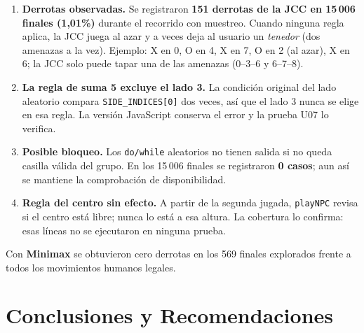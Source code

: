 \documentclass[12pt,a4paper]{article}
\begin{document}
\begin{enumerate}
  \item \textbf{Derrotas observadas.} Se registraron \textbf{151 derrotas de la JCC
        en 15\,006 finales (1,01\%)} durante el recorrido con muestreo. Cuando
        ninguna regla aplica, la JCC juega al azar y a veces deja al usuario un
        \emph{tenedor} (dos amenazas a la vez). Ejemplo: X en 0, O en 4, X en 7,
        O en 2 (al azar), X en 6; la JCC solo puede tapar una de las amenazas
        (0--3--6 y 6--7--8).
  \item \textbf{La regla de suma 5 excluye el lado 3.} La condición original del
        lado aleatorio compara \texttt{SIDE\_INDICES[0]} dos veces, así que el
        lado 3 nunca se elige en esa regla. La versión JavaScript conserva el
        error y la prueba U07 lo verifica.
  \item \textbf{Posible bloqueo.} Los \texttt{do/while} aleatorios no tienen salida
        si no queda casilla válida del grupo. En los 15\,006 finales se registraron
        \textbf{0 casos}; aun así se mantiene la comprobación de disponibilidad.
  \item \textbf{Regla del centro sin efecto.} A partir de la segunda jugada,
        \texttt{playNPC} revisa si el centro está libre; nunca lo está a esa altura.
        La cobertura lo confirma: esas líneas no se ejecutaron en ninguna prueba.
\end{enumerate}

Con \textbf{Minimax} se obtuvieron cero derrotas en los 569 finales explorados
frente a todos los movimientos humanos legales.

\section{Conclusiones y Recomendaciones}
\end{document}
